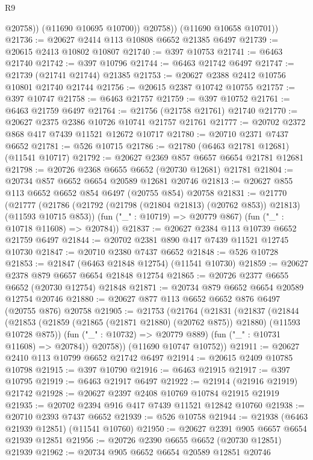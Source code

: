 \begin{lexlean}{R9}
\begin{coremodule}
{{{{{{{{{{{{{{{{{{{{{{{{{{{{{{{{{{{{{{{{{{{{{{{{{{{{{{{{{{{{{{{{{{{{{{{{{{{{{{{{{{{{                @20758))
            (@11690 @10695 @10700))
          @20758))
      (@11690 @10658 @10701))
@21736 := @20627 @2414 @113 @10808 @6652 @21385 @6497
@21739 := @20615 @2413 @10802 @10807
@21740 := @397 @10753
@21741 := @6463 @21740
@21742 := @397 @10796
@21744 := @6463 @21742 @6497
@21747 := @21739 (@21741 @21744) @21385
@21753 := @20627 @2388 @2412 @10756 @10801 @21740 @21744
@21756 := @20615 @2387 @10742 @10755
@21757 := @397 @10747
@21758 := @6463 @21757
@21759 := @397 @10752
@21761 := @6463 @21759 @6497
@21764 := @21756 (@21758 @21761) @21740
@21770 := @20627 @2375 @2386 @10726 @10741 @21757 @21761
@21777 := @20702 @2372 @868 @417 @7439 @11521 @12672 @10717
@21780 := @20710 @2371 @7437 @6652
@21781 := @526 @10715
@21786 := @21780 (@6463 @21781 @12681) (@11541 @10717)
@21792 := @20627 @2369 @857 @6657 @6654 @21781 @12681
@21798 := @20726 @2368 @6655 @6652 (@20730 @12681) @21781
@21804 := @20734 @857 @6652 @6654 @20589 @12681 @20746
@21813 := @20627 @855 @113 @6652 @6652 @854 @6497 (@20755 @854) @20758
@21831 := @21770
    (@21777
      (@21786 (@21792 (@21798 (@21804 @21813) (@20762 @853)) @21813) (@11593 @10715 @853))
      (fun ("_" : @10719) => @20779 @867)
      (fun ("_" : @10718 @11608) => @20784))
@21837 := @20627 @2384 @113 @10739 @6652 @21759 @6497
@21844 := @20702 @2381 @890 @417 @7439 @11521 @12745 @10730
@21847 := @20710 @2380 @7437 @6652
@21848 := @526 @10728
@21853 := @21847 (@6463 @21848 @12754) (@11541 @10730)
@21859 := @20627 @2378 @879 @6657 @6654 @21848 @12754
@21865 := @20726 @2377 @6655 @6652 (@20730 @12754) @21848
@21871 := @20734 @879 @6652 @6654 @20589 @12754 @20746
@21880 := @20627 @877 @113 @6652 @6652 @876 @6497 (@20755 @876) @20758
@21905 := @21753
    (@21764
      (@21831
        (@21837
          (@21844
            (@21853 (@21859 (@21865 (@21871 @21880) (@20762 @875)) @21880) (@11593 @10728 @875))
            (fun ("_" : @10732) => @20779 @889)
            (fun ("_" : @10731 @11608) => @20784))
          @20758))
      (@11690 @10747 @10752))
@21911 := @20627 @2410 @113 @10799 @6652 @21742 @6497
@21914 := @20615 @2409 @10785 @10798
@21915 := @397 @10790
@21916 := @6463 @21915
@21917 := @397 @10795
@21919 := @6463 @21917 @6497
@21922 := @21914 (@21916 @21919) @21742
@21928 := @20627 @2397 @2408 @10769 @10784 @21915 @21919
@21935 := @20702 @2394 @916 @417 @7439 @11521 @12842 @10760
@21938 := @20710 @2393 @7437 @6652
@21939 := @526 @10758
@21944 := @21938 (@6463 @21939 @12851) (@11541 @10760)
@21950 := @20627 @2391 @905 @6657 @6654 @21939 @12851
@21956 := @20726 @2390 @6655 @6652 (@20730 @12851) @21939
@21962 := @20734 @905 @6652 @6654 @20589 @12851 @20746
}}}}}}}}}}}}}}}}}}}}}}}}}}}}}}}}}}}}}}}}}}}}}}}}}}}}}}}}}}}}}}}}}}}}}}}}}}}}}}}}}}}}
\end{coremodule}
\end{lexlean}
